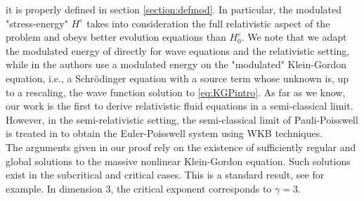 \documentclass[a4paper, 15pt]{article}
\numberwithin{equation}{section}
\begin{document}
it is properly defined in section \ref{section:defmod}.
In particular, the modulated "stress-energy" $H^\varepsilon$ takes into consideration the full relativistic aspect of the problem and obeys better evolution equations than $H^\varepsilon_0$. We note that we adapt the modulated energy of \cite{zbMATH05243173} directly for wave equations and the relativistic setting, while in \cite{zbMATH06101438} the authors use a modulated energy on the "modulated" Klein-Gordon equation, i.e., a Schrödinger equation with a source term whose unknown is, up to a rescaling, the wave function solution to \eqref{eq:KGPintro}. As far as we know, our work is the first to derive relativistic fluid equations in a semi-classical limit. However, in the semi-relativistic setting, the semi-classical limit of Pauli-Poisswell is treated in \cite{yang2024semiclassicallimitpaulipoisswelleulerpoisswell} to obtain the Euler-Poisswell system using WKB techniques.  \\
The arguments given in our proof rely on the existence of sufficiently regular and global solutions to the massive nonlinear Klein-Gordon equation. Such solutions exist in the subcritical and critical cases. This is a standard result, see \cite{Brenner1979,Wahl1981,zbMATH03875887,zbMATH04202876,zbMATH00011219,zbMATH00168350,zbMATH00703984,zbMATH00817689,zbMATH05035890,luk2014introduction} for example. In dimension 3, the critical exponent corresponds to $\gamma=3$.
\end{document}
